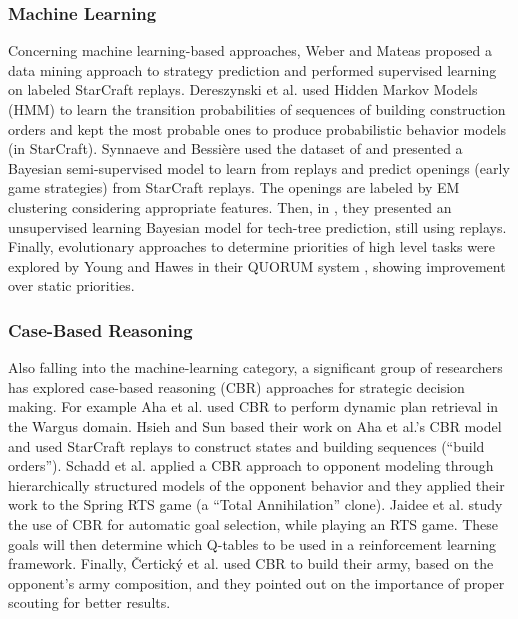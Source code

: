 \documentclass{llncs}
\begin{document}
\subsubsection{Machine Learning}
Concerning  machine   learning-based  approaches,  Weber   and  Mateas
\cite{WeberCig09}  proposed   a  data  mining  approach   to  strategy
prediction  and performed  supervised  learning  on labeled  StarCraft
replays.  Dereszynski et  al. \cite{HMMstrat_RTS_AIIDE11}  used Hidden
Markov Models (HMM) to learn the transition probabilities of sequences
of building  construction orders  and kept the  most probable  ones to
produce  probabilistic behavior  models (in  StarCraft). Synnaeve  and
Bessi\`{e}re   \cite{SynnaeveOpeningCig11}   used   the   dataset   of
\cite{WeberCig09} and  presented a  Bayesian semi-supervised  model to
learn from replays  and predict openings (early  game strategies) from
StarCraft  replays.   The  openings  are  labeled   by  EM  clustering
considering  appropriate  features. Then,  in  \cite{SynnaeveAIIDE11},
they presented  an unsupervised learning Bayesian  model for tech-tree
prediction, still using
replays. %
Finally, evolutionary approaches to determine priorities of high level
tasks  were  explored  by  Young  and Hawes  in  their  QUORUM  system
\cite{young2012evolutionary},   showing    improvement   over   static
priorities.

\subsubsection{Case-Based Reasoning}
Also falling  into the machine-learning category,  a significant group
of    researchers   has    explored    case-based   reasoning    (CBR)
\cite{Aamodt94CBR}  approaches  for  strategic  decision  making.  For
example  Aha  et al.  \cite{LTW}  used  CBR  to perform  dynamic  plan
retrieval in  the Wargus domain.  Hsieh and Sun  \cite{HsiehS08} based
their work  on Aha et  al.'s CBR  model \cite{LTW} and  used StarCraft
replays   to  construct   states  and   building  sequences   (``build
orders''). Schadd et  al. \cite{SchaddBS07} applied a  CBR approach to
opponent  modeling through  hierarchically  structured  models of  the
opponent behavior and  they applied their work to the  Spring RTS game
(a ``Total Annihilation'' clone).  Jaidee et al. \cite{jaidee2011case}
study the  use of CBR for  automatic goal selection, while  playing an
RTS game. These goals will then determine which Q-tables to be used in
a  reinforcement  learning  framework.  Finally,  \v{C}ertick\'{y}  et
al. \cite{certicky2013cbr} used CBR to  build their army, based on the
opponent's army composition, and they pointed out on the importance of
proper scouting for better results.
\end{document}
